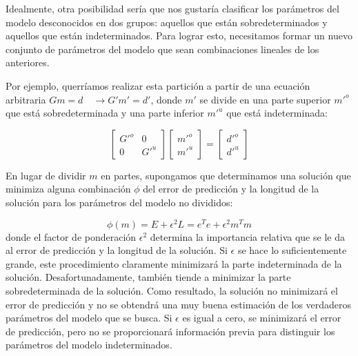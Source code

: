 \documentclass[aspectratio=169]{beamer}
\begin{document}
\begin{frame}

{\color{black}
Idealmente, otra posibilidad sería que nos gustaría clasificar los parámetros del modelo desconocidos en dos grupos: aquellos que están sobredeterminados y aquellos que están indeterminados. Para lograr esto, necesitamos formar un nuevo conjunto de parámetros del modelo que sean combinaciones lineales de los anteriores. 

Por ejemplo, querríamos realizar esta partición a partir de una ecuación arbitraria $Gm = d \quad \rightarrow  G'm'= d'$, donde $m'$ se divide en una parte superior $m'^o$ que está sobredeterminada y una parte inferior $m'^u$ que está indeterminada:

\begin{equation}
 \begin{bmatrix}
 G'^o & 0 \\
 0    & G'^u 
 \end{bmatrix} 
 \begin{bmatrix}
  m'^o \\
  m'^u 
 \end{bmatrix} = 
 \begin{bmatrix}
  d'^o \\
  d'^u
 \end{bmatrix}
\end{equation}
}

\end{frame}


\begin{frame}

{\color{black}
 En lugar de dividir $m$ en partes, supongamos que determinamos una solución que minimiza alguna combinación $\phi$ del error de predicción y la longitud de la solución para los parámetros del modelo no divididos:
 
 \begin{equation}
  \phi(m) = E + \epsilon^2 L = e^Te + \epsilon^2 m^Tm
 \end{equation}
donde el factor de ponderación $\epsilon^2$ determina la importancia relativa que se le da al error de predicción y la longitud de la solución. Si $\epsilon$ se hace lo suficientemente grande, este procedimiento claramente minimizará la parte indeterminada de la solución. Desafortunadamente, también tiende a minimizar la parte sobredeterminada de la solución. Como resultado, la solución no minimizará el error de predicción y no se obtendrá una muy buena estimación de los verdaderos parámetros del modelo que se busca. Si $\epsilon$ es igual a cero, se minimizará el error de predicción, pero no se proporcionará información previa para distinguir los parámetros del modelo indeterminados. 
}

\end{frame}
\end{document}
